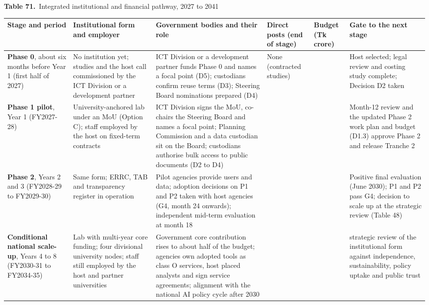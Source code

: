 \documentclass[border=10pt]{standalone}
\begin{document}
\begin{minipage}{22cm}
{\large\bfseries Table 71.}\ {\large Integrated institutional and financial pathway, 2027 to 2041}\par\vspace{7pt}
\small
{}
\begin{tabularx}{\linewidth}{@{}>{\hsize=1.274\hsize\raggedright\arraybackslash}X>{\hsize=1.221\hsize\raggedright\arraybackslash}X>{\hsize=1.381\hsize\raggedright\arraybackslash}X>{\hsize=0.478\hsize\raggedright\arraybackslash}X>{\hsize=0.531\hsize\raggedright\arraybackslash}X>{\hsize=1.115\hsize\raggedright\arraybackslash}X@{}}
\arrayrulecolor{bapilrule}\toprule
\rowcolor{white}\textbf{Stage and period} & \textbf{Institutional form and employer} & \textbf{Government bodies and their role} & \textbf{Direct posts (end of stage)} & \textbf{Budget (Tk crore)} & \textbf{Gate to the next stage} \\
\midrule
\textbf{Phase 0}, about six months before Year 1 (first half of 2027) & No institution yet; studies and the host call commissioned by the ICT Division or a development partner & ICT Division or a development partner funds Phase 0 and names a focal point (D5); custodians confirm reuse terms (D3); Steering Board nominations prepared (D4) & None (contracted studies) & 0.44 & Host selected; legal review and costing study complete; Decision D2 taken \\
\textbf{Phase 1 pilot}, Year 1 (FY2027-28) & University-anchored lab under an MoU (Option C); staff employed by the host on fixed-term contracts & ICT Division signs the MoU, co-chairs the Steering Board and names a focal point; Planning Commission and a data custodian sit on the Board; custodians authorise bulk access to public documents (D2 to D4) & 9 & 4.73 & Month-12 review and the updated Phase 2 work plan and budget (D1.3) approve Phase 2 and release Tranche 2 \\
\textbf{Phase 2}, Years 2 and 3 (FY2028-29 to FY2029-30) & Same form; ERRC, TAB and transparency register in operation & Pilot agencies provide users and data; adoption decisions on P1 and P2 taken with host agencies (G4, month 24 onwards); independent mid-term evaluation at month 18 & 19 & 15.70 & Positive final evaluation (June 2030); P1 and P2 pass G4; decision to scale up at the strategic review (Table 48) \\
\textbf{Conditional national scale-up}, Years 4 to 8 (FY2030-31 to FY2034-35) & Lab with multi-year core funding; four divisional university nodes; staff still employed by the host and partner universities & Government core contribution rises to about half of the budget; agencies own adopted tools as class O services, host placed analysts and sign service agreements; alignment with the national AI policy cycle after 2030 & 118 & 218.85 & 2035 strategic review of the institutional form against independence, sustainability, policy uptake and public trust \\

\end{tabularx}
\end{minipage}
\end{document}
